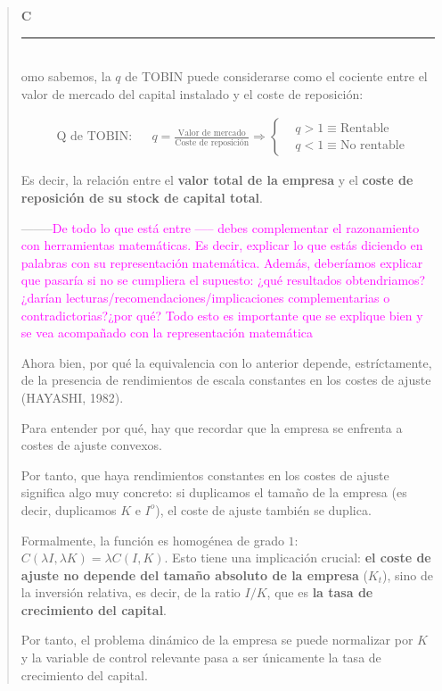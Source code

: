 \documentclass[10pt,a4paper]{article}
\newenvironment{specialblock}[1]{%
      \begin{quote} %
      \small %
      \noindent\textbf{#1}\\[-0.3em] %
      \rule{\linewidth}{0.4pt}\\[0.6em]}{
      \end{quote}}
\begin{document}
\begin{specialblock}
  Como sabemos, la $q$ de TOBIN puede considerarse como el cociente entre el valor de mercado del capital instalado y el coste de reposición:
  
  $$\begin{aligned}
      &\text{Q de TOBIN}:&& {q=\frac{\text{Valor de mercado}}{\text{Coste de reposición}}}\Longrightarrow
      \left\{\begin{aligned}
          &q>1\equiv\text{Rentable}\\[0.5em]
          &q<1\equiv\text{No rentable}
      \end{aligned}\right.
  \end{aligned}$$
  
  Es decir, la relación entre el \textbf{valor total de la empresa} y el \textbf{coste de reposición de su stock de capital total}.

  --------\textcolor{magenta}{De todo lo que está entre ----- debes complementar el razonamiento con herramientas matemáticas. Es decir, explicar lo que estás diciendo en palabras con su representación matemática. Además, deberíamos explicar que pasaría si no se cumpliera el supuesto: ¿qué resultados obtendriamos? ¿darían lecturas/recomendaciones/implicaciones complementarias o contradictorias?¿por qué? Todo esto es importante que se explique bien y se vea acompañado con la representación matemática}

  Ahora bien, por qué la equivalencia con lo anterior depende, estríctamente, de la presencia de rendimientos de escala constantes en los costes de ajuste (HAYASHI, 1982). 
  
  Para entender por qué, hay que recordar que la empresa se enfrenta a costes de ajuste convexos. 

  Por tanto, que haya rendimientos constantes en los costes de ajuste significa algo muy concreto: si duplicamos el tamaño de la empresa (es decir, duplicamos $K$ e $I^o$), el coste de ajuste también se duplica. 
  
  Formalmente, la función es homogénea de grado $1$: $C(\lambda I, \lambda K) = \lambda C(I,K)$. Esto tiene una implicación crucial: \textbf{el coste de ajuste no depende del tamaño absoluto de la empresa} ($K_t$), sino de la inversión relativa, es decir, de la ratio $I/K$, que es \textbf{la tasa de crecimiento del capital}. 
  
  Por tanto, el problema dinámico de la empresa se puede normalizar por $K$ y la variable de control relevante pasa a ser únicamente la tasa de crecimiento del capital.


\end{specialblock}
\end{document}
